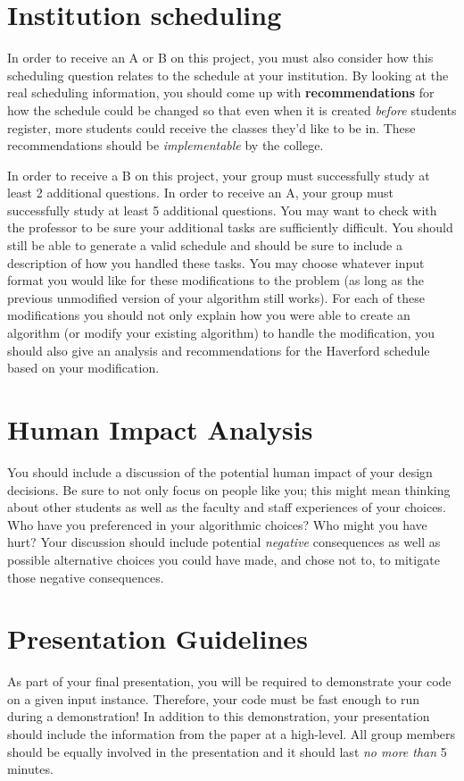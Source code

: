 \documentclass[12pt]{article}
\begin{document}
\section{Institution scheduling}
\label{additional_tasks}
In order to receive an A or B on this project, you must also consider how this scheduling question relates to the schedule at your institution.  By looking at the real scheduling information, you should come up with \textbf{recommendations} for how the schedule could be changed so that even when it is created \emph{before} students register, more students could receive the classes they'd like to be in.  These recommendations should be \emph{implementable} by the college.

In order to receive a B on this project, your group must successfully study at least 2 additional questions.  In order to receive an A, your group must successfully study at least 5 additional questions.  
You may want to check with the professor to be sure your additional tasks are sufficiently difficult.  
You should still be able to generate a valid schedule and should be sure to include a description of how you handled these tasks. You may choose whatever input format you would like for these modifications to the problem (as long as the previous unmodified version of your algorithm still works).  For each of these modifications you should not only explain how you were able to create an algorithm (or modify your existing algorithm) to handle the modification, you should also give an analysis and recommendations for the Haverford schedule based on your modification.

\section{Human Impact Analysis}
You should include a discussion of the potential human impact of your design decisions.  Be sure to not only focus on people like you; this might mean thinking about other students as well as the faculty and staff experiences of your choices.  Who have you preferenced in your algorithmic choices?  Who might you have hurt?  Your discussion should include potential \emph{negative} consequences as well as possible alternative choices you could have made, and chose not to, to mitigate those negative consequences.

\section{Presentation Guidelines}
As part of your final presentation, you will be required to demonstrate your code on a given input instance. Therefore, your code must be fast enough to run during a demonstration! In addition to this demonstration, your presentation should include the information from the paper at a high-level. All group members should be equally involved in the presentation and it should last \emph{no more than} 5 minutes.
\end{document}
